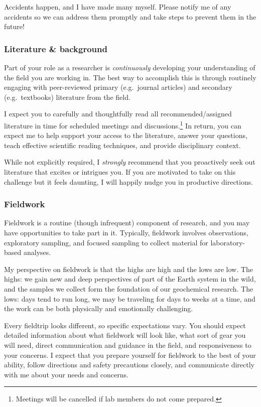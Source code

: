 Accidents happen, and I have made many myself. 
Please notify me of any accidents so we can address them promptly and take steps to prevent them in the future!


\subsubsection{Literature \& background}
Part of your role as a researcher is \emph{continuously} developing your understanding of the field you are working in.
The best way to accomplish this is through routinely engaging with peer-reviewed primary (e.g.~journal articles) and secondary (e.g.~textbooks) literature from the field. 

I expect you to carefully and thoughtfully read all recommended/assigned literature in time for scheduled meetings and discussions.\footnote{Meetings will be cancelled if lab members do not come prepared.}
In return, you can expect me to help support your access to the literature, answer your questions, teach effective scientific reading techniques, and provide disciplinary context. 

While not explicitly required, I \emph{strongly} recommend that you proactively seek out literature that excites or intrigues you. 
If you are motivated to take on this challenge but it feels daunting, I will happily nudge you in productive directions.

\subsubsection{Fieldwork}
Fieldwork is a routine (though infrequent) component of \grackle{} research, and you may have opportunities to take part in it. 
Typically, fieldwork involves observations, exploratory sampling, and focused sampling to collect material for laboratory-based analyses. 

My perspective on fieldwork is that the highs are high and the lows are low.
The highs: we gain new and deep perspectives of part of the Earth system in the wild, and the samples we collect form the foundation of our geochemical research.
The lows: days tend to run long, we may be traveling for days to weeks at a time, and the work can be both physically and emotionally challenging. 

Every fieldtrip looks different, so specific expectations vary. 
You should expect detailed information about what fieldwork will look like, what sort of gear you will need, direct communication and guidance in the field, and responsiveness to your concerns. 
I expect that you prepare yourself for fieldwork to the best of your ability, follow directions and safety precautions closely, and communicate directly with me about your needs and concerns.

